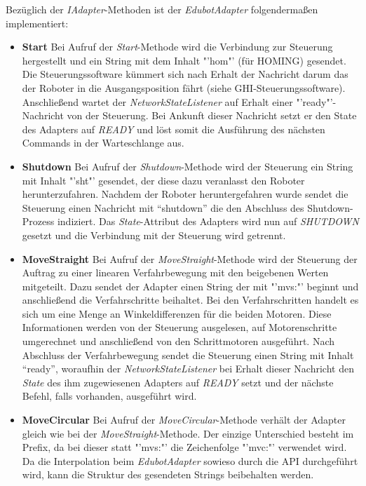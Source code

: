 Bezüglich der \textit{IAdapter}-Methoden ist der \textit{EdubotAdapter} folgendermaßen implementiert:
\begin{itemize}
\item \textbf{Start}
\newline
Bei Aufruf der \textit{Start}-Methode wird die Verbindung zur Steuerung hergestellt und ein String mit dem Inhalt "'hom"' (für HOMING) gesendet. Die Steuerungssoftware kümmert sich nach Erhalt der Nachricht darum das der Roboter in die Ausgangsposition fährt (siehe GHI-Steuerungssoftware). Anschließend wartet der \textit{NetworkStateListener} auf Erhalt einer "'ready"'-Nachricht von der Steuerung. Bei Ankunft dieser Nachricht setzt er den State des Adapters auf \textit{READY} und löst somit die Ausführung des nächsten Commands in der Warteschlange aus.
\item \textbf{Shutdown}
\newline
Bei Aufruf der \textit{Shutdown}-Methode wird der Steuerung ein String mit Inhalt "'sht"' gesendet, der diese dazu veranlasst den Roboter herunterzufahren. Nachdem der Roboter heruntergefahren wurde sendet die Steuerung einen Nachricht mit “shutdown” die den Abschluss des Shutdown-Prozess indiziert. Das \textit{State}-Attribut des Adapters wird nun auf \textit{SHUTDOWN} gesetzt und die Verbindung mit der Steuerung wird getrennt.
\item \textbf{MoveStraight}
\newline
Bei Aufruf der \textit{MoveStraight}-Methode wird der Steuerung der Auftrag zu einer linearen Verfahrbewegung mit den beigebenen Werten mitgeteilt. Dazu sendet der Adapter einen String der mit "'mvs:"' beginnt und anschließend die Verfahrschritte beihaltet. Bei den Verfahrschritten handelt es sich um eine Menge an Winkeldifferenzen für die beiden Motoren. Diese Informationen werden von der Steuerung ausgelesen, auf Motorenschritte umgerechnet und anschließend von den Schrittmotoren ausgeführt. Nach Abschluss der Verfahrbewegung sendet die Steuerung einen String mit Inhalt “ready”, woraufhin der \textit{NetworkStateListener} bei Erhalt dieser Nachricht den \textit{State} des ihm zugewiesenen Adapters auf \textit{READY} setzt und der nächste Befehl, falls vorhanden, ausgeführt wird.
\item \textbf{MoveCircular}
\newline
Bei Aufruf der \textit{MoveCircular}-Methode verhält der Adapter gleich wie bei der \textit{MoveStraight}-Methode. Der einzige Unterschied besteht im Prefix, da bei dieser statt "'mvs:"' die Zeichenfolge "'mvc:"' verwendet wird. Da die Interpolation beim \textit{EdubotAdapter} sowieso durch die API durchgeführt wird, kann die Struktur des gesendeten Strings beibehalten werden.

\end{itemize}
